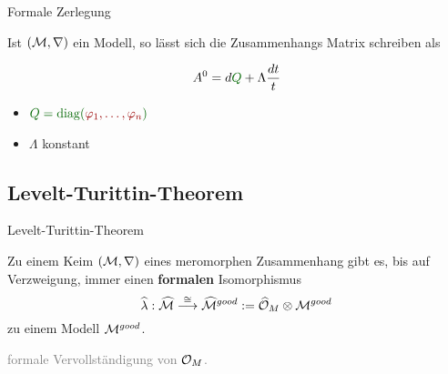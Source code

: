 \begin{frame}[t]{Formale Zerlegung}
  \begin{lem}
    Ist $(\mathcal{M},\nabla)$ ein Modell, so lässt sich die Zusammenhangs Matrix
    schreiben als
    \begin{multicols}{2}
      \[
        A^0=d\overset{~\tikzmark{e1}}{\textcolor{green!40!black}{Q}}
           +~\tikzmark{e2}\!\!\Lambda\frac{dt}{t}
      \]
      \columnbreak
      \begin{itemize}
        \item[\tikzmarkb{n1}{green}]
          $\textcolor{green!40!black}{Q
            =\diag(\textcolor{red!60!black}{\phi_1,\dots,\phi_n})}$
        \item[\tikzmarkc{n2}{blue}]
          $\Lambda$ konstant
      \end{itemize}
    \end{multicols}
  \end{lem}
  \vfill
  \vfill
\end{frame}
\subsection{Levelt-Turittin-Theorem}
\begin{frame}{Levelt-Turittin-Theorem}
  \begin{tthm}
    Zu einem Keim $(\mathcal{M},\nabla)$ eines meromorphen Zusammenhang gibt es, bis
    auf Verzweigung, immer einen \textbf{formalen} Isomorphismus
    \[
      \hat\lambda:\hat\cM
      \overset{\cong}\longrightarrow
      \hat\cM^{good}:=~\tikzmark{e1}\!\!\hat\cO_M\otimes\cM^{good}
    \]
    zu einem Modell $\mathcal{M}^{good}$.
  \end{tthm}
  \begin{flushright}
    \textcolor{gray}{formale Vervollständigung von $\mathcal{O}_M$.}
  \end{flushright}
\end{frame}

